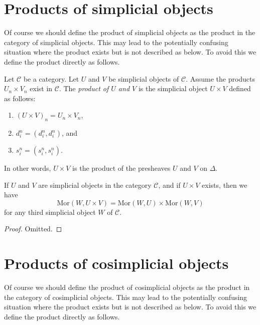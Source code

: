 \section{Products of simplicial objects}
\label{section-products}

\noindent
Of course we should define the product of simplicial objects
as the product in the category of simplicial objects. This
may lead to the potentially confusing situation where the product exists
but is not described as below. To avoid this we define the product
directly as follows.

\begin{definition}
\label{definition-product}
Let $\mathcal{C}$ be a category.
Let $U$ and $V$ be simplicial objects of $\mathcal{C}$.
Assume the products $U_n \times V_n$ exist in $\mathcal{C}$.
The {\it product of $U$ and $V$} is the simplicial object
$U\times V$ defined as follows:
\begin{enumerate}
\item $(U \times V)_n = U_n \times V_n$,
\item $d^n_i = (d^n_i, d^n_i)$, and
\item $s^n_i = (s^n_i, s^n_i)$.
\end{enumerate}
In other words, $U\times V$ is the product of the presheaves
$U$ and $V$ on $\Delta$.
\end{definition}

\begin{lemma}
\label{lemma-product}
If $U$ and $V$ are simplicial objects in the category $\mathcal{C}$,
and if $U\times V$ exists, then we have
$$
\text{Mor}(W, U\times V) = 
\text{Mor}(W, U) \times
\text{Mor}(W, V)
$$
for any third simplicial object $W$ of $\mathcal{C}$.
\end{lemma}

\begin{proof}
Omitted.
\end{proof}














\section{Products of cosimplicial objects}
\label{section-products-cosimplicial}

\noindent
Of course we should define the product of cosimplicial objects
as the product in the category of cosimplicial objects. This
may lead to the potentially confusing situation where the product exists
but is not described as below. To avoid this we define the product
directly as follows.

